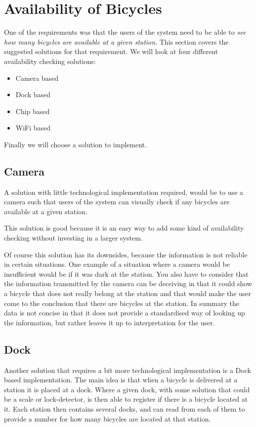 \section{Availability of Bicycles}\label{sec:availability}
One of the requirements was that the users of the system need to be able to \textit{see how many bicycles are available at a given station}.
This section covers the suggested solutions for that requirement.
We will look at four different availability checking solutions:

\begin{itemize}
\item Camera based
\item Dock based
\item Chip based
\item WiFi based
\end{itemize} 

Finally we will choose a solution to implement.

\subsection{Camera}
A solution with little technological implementation required, would be to use a camera such that users of the system can visually check if any bicycles are available at a given station. 

This solution is good because it is an easy way to add some kind of availability checking without investing in a larger system.

Of course this solution has its downsides, because the information is not reliable in certain situations. 
One example of a situation where a camera would be insufficient would be if it was dark at the station.
You also have to consider that the information transmitted by the camera can be deceiving in that it could show a bicycle that does not really belong at the station and that would make the user come to the conclusion that there are bicycles at the station.
In summary the data is not concise in that it does not provide a standardised way of looking up the information, but rather leaves it up to interpretation for the user.

\subsection{Dock}
Another solution that requires a bit more technological implementation is a Dock based implementation.
The main idea is that when a bicycle is delivered at a station it is placed at a dock.
Where a given dock, with some solution that could be a scale or lock-detector, is then able to register if there is a bicycle located at it.
Each station then contains several docks, and can read from each of them to provide a number for how many bicycles are located at that station. 

